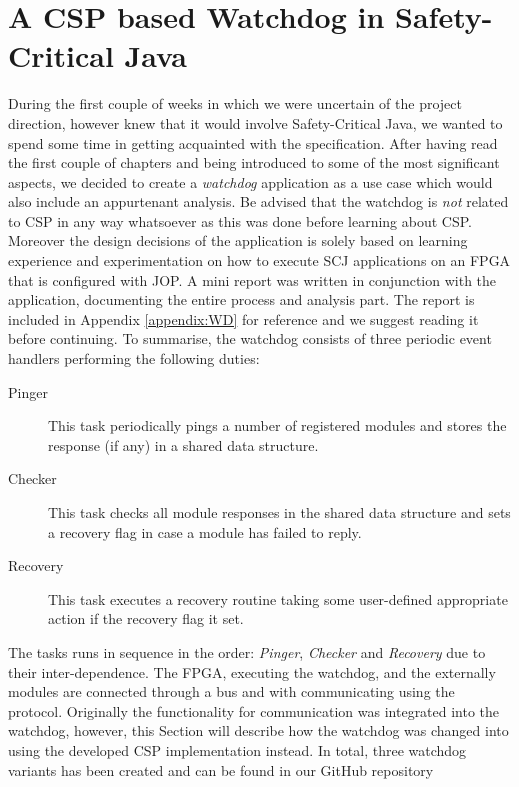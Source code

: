 \chapter{A CSP based Watchdog in Safety-Critical Java}
\label{chapter:watchdogcsp}
During the first couple of weeks in which we were uncertain of the project direction, however knew that it would involve Safety-Critical Java, we wanted to spend some time in getting acquainted with the specification. After having read the first couple of chapters and being introduced to some of the most significant aspects, we decided to create a \textit{watchdog} application as a use case which would also include an appurtenant analysis. Be advised that the watchdog is \textit{not} related to CSP in any way whatsoever as this was done before learning about CSP. Moreover the design decisions of the application is solely based on learning experience and experimentation on how to execute SCJ applications on an FPGA that is configured with JOP. A mini report was written in conjunction with the application, documenting the entire process and analysis part. The report is included in Appendix \ref{appendix:WD} for reference and we suggest reading it before continuing. To summarise, the watchdog consists of three periodic event handlers performing the following duties:

\begin{description}
	\item[Pinger] This task periodically pings a number of registered modules and stores the response (if any) in a shared data structure.
	\item[Checker] This task checks all module responses in the shared data structure and sets a recovery flag in case a module has failed to reply.
	\item[Recovery] This task executes a recovery routine taking some user-defined appropriate action if the recovery flag it set. 
\end{description}

The tasks runs in sequence in the order: \textit{Pinger}, \textit{Checker} and \textit{Recovery} due to their inter-dependence. The FPGA, executing the watchdog, and the externally modules are connected through a bus and with communicating using the \iic protocol. Originally the functionality for \iic communication was integrated into the watchdog, however, this Section will describe how the watchdog was changed into using the developed CSP implementation instead. In total, three watchdog variants has been created and can be found in our GitHub repository~\cite{SW902e12:CSPinSCJ}

